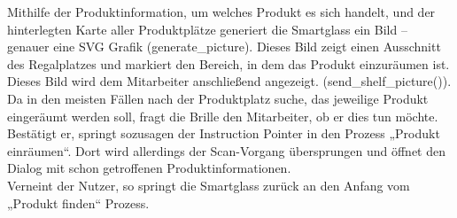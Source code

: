 Mithilfe der Produktinformation, um welches Produkt es sich handelt, und der hinterlegten Karte aller Produktplätze generiert die Smartglass ein Bild – genauer eine SVG Grafik (generate_picture). Dieses Bild zeigt einen Ausschnitt des Regalplatzes und markiert den Bereich, in dem das Produkt einzuräumen ist. Dieses Bild wird dem Mitarbeiter anschließend angezeigt. (send_shelf_picture()).
\\
Da in den meisten Fällen nach der Produktplatz suche, das jeweilige Produkt eingeräumt werden soll, fragt die Brille den Mitarbeiter, ob er dies tun möchte. 
Bestätigt er, springt sozusagen der Instruction Pointer in den Prozess „Produkt einräumen“. Dort wird allerdings der Scan-Vorgang übersprungen und öffnet den Dialog mit schon getroffenen Produktinformationen. 
\\
Verneint der Nutzer, so springt die Smartglass zurück an den Anfang vom „Produkt finden“ Prozess. 

